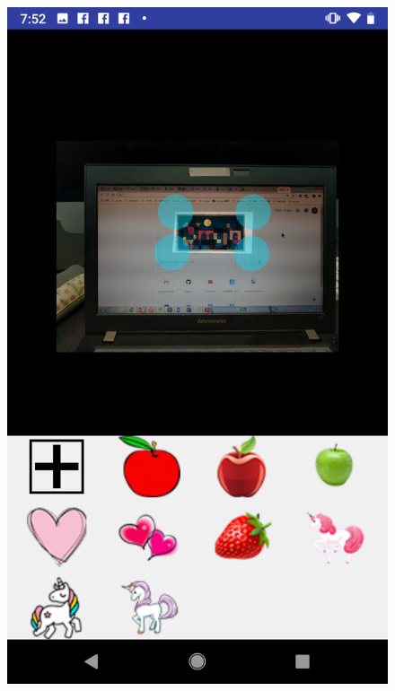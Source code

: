 \begin{figure}[htb]
\centering
\begin{minipage}[H]{0.3\textwidth}
\includegraphics[width=.95\textwidth]{section05/assets/resultExample2.png}
\subcaption{\label{RegionSelected}}
\end{minipage}%
\begin{minipage}[H]{0.3\textwidth}

\end{minipage}
\end{figure}
